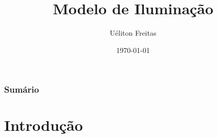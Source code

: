 \documentclass{beamer}
\title[Computação Gráfica]{Modelo de Iluminação} %
\author{Uéliton Freitas} %
\institute[UFMS] %
{
Universidade Católica Dom Bosco - UCDB \\ %
\medskip
\textit{freitas.ueliton@gmail.com} %
}
\date{\today} %
\begin{document}
\begin{frame}
\titlepage %
\end{frame}

\begin{frame}
\frametitle{Sumário} %
\tableofcontents %
\end{frame}





\section{Introdução} 

\end{document}
